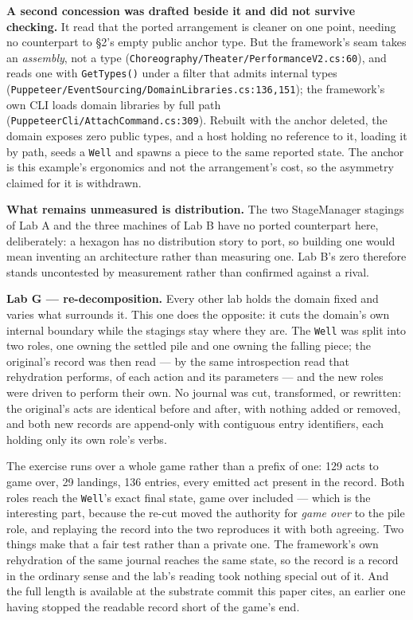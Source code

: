 \documentclass[
]{article}
\begin{document}
\textbf{A second concession was drafted beside it and did not survive
checking.} It read that the ported arrangement is cleaner on one point,
needing no counterpart to §2's empty public anchor type. But the
framework's seam takes an \emph{assembly}, not a type
(\texttt{Choreography/Theater/PerformanceV2.cs:60}), and reads one with
\texttt{GetTypes()} under a filter that admits internal types
(\texttt{Puppeteer/EventSourcing/DomainLibraries.cs:136,151}); the
framework's own CLI loads domain libraries by full path
(\texttt{PuppeteerCli/AttachCommand.cs:309}). Rebuilt with the anchor
deleted, the domain exposes zero public types, and a host holding no
reference to it, loading it by path, seeds a \texttt{Well} and spawns a
piece to the same reported state. The anchor is this example's
ergonomics and not the arrangement's cost, so the asymmetry claimed for
it is withdrawn.

\textbf{What remains unmeasured is distribution.} The two StageManager
stagings of Lab A and the three machines of Lab B have no ported
counterpart here, deliberately: a hexagon has no distribution story to
port, so building one would mean inventing an architecture rather than
measuring one. Lab B's zero therefore stands uncontested by measurement
rather than confirmed against a rival.

\textbf{Lab G --- re-decomposition.} Every other lab holds the domain
fixed and varies what surrounds it. This one does the opposite: it cuts
the domain's own internal boundary while the stagings stay where they
are. The \texttt{Well} was split into two roles, one owning the settled
pile and one owning the falling piece; the original's record was then
read --- by the same introspection read that rehydration performs, of
each action and its parameters --- and the new roles were driven to
perform their own. No journal was cut, transformed, or rewritten: the
original's acts are identical before and after, with nothing added or
removed, and both new records are append-only with contiguous entry
identifiers, each holding only its own role's verbs.

The exercise runs over a whole game rather than a prefix of one: 129
acts to game over, 29 landings, 136 entries, every emitted act present
in the record. Both roles reach the \texttt{Well}'s exact final state,
game over included --- which is the interesting part, because the re-cut
moved the authority for \emph{game over} to the pile role, and replaying
the record into the two reproduces it with both agreeing. Two things
make that a fair test rather than a private one. The framework's own
rehydration of the same journal reaches the same state, so the record is
a record in the ordinary sense and the lab's reading took nothing
special out of it. And the full length is available at the substrate
commit this paper cites, an earlier one having stopped the readable
record short of the game's end.
\end{document}
